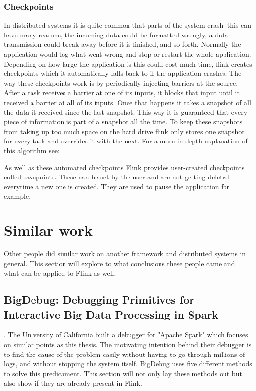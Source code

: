 \subsubsection{Checkpoints}
\label{checkpoints}

In distributed systems it is quite common that parts of the system crash, this can have many reasons, the incoming data could be formatted wrongly, a data transmission could break away before it is finished, and so forth. Normally the application would log what went wrong and stop or restart the whole application. Depending on how large the application is this could cost much time, flink creates checkpoints which it automatically falls back to if the application crashes. The way these checkpoints work is by periodically injecting barriers at the source. After a task receives a barrier at one of its inputs, it blocks that input until it received a barrier at all of its inputs. Once that happens it takes a snapshot of all the data it received since the last snapshot. This way it is guaranteed that every piece of information is part of a snapshot all the time. To keep these snapshots from taking up too much space on the hard drive flink only stores one snapshot for every task and overrides it with the next. For a more in-depth explanation of this algorithm see: \cite{DBLP:journals/corr/CarboneFEHT15}

As well as these automated checkpoints Flink provides user-created checkpoints called savepoints. These can be set by the user and are not getting deleted everytime a new one is created. They are used to pause the application for example.


\section{Similar work}
\label{similarWork}

Other people did similar work on another framework and distributed systems in general. This section will explore to what conclusions these people came and what can be applied to Flink as well.

\subsection{BigDebug: Debugging Primitives for Interactive Big Data Processing in Spark}

\cite{Gulzar:2016:BDP:2884781.2884813}. The University of California built a debugger for "Apache Spark" which focuses on similar points as this thesis. The motivating intention behind their debugger is to find the cause of the problem easily without having to go through millions of logs, and without stopping the system itself. BigDebug uses five different methods to solve this predicament. This section will not only lay these methods out but also show if they are already present in Flink.

